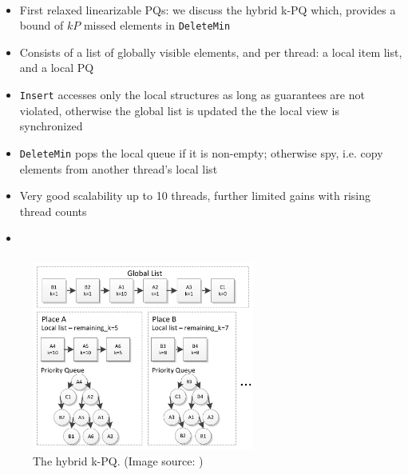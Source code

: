 \documentclass[usenames,dvipsnames]{beamer}
\begin{document}
\begin{frame}{}
\framesubtitle{\citeauthor{wimmer2013data}}
\begin{itemize}
\item First relaxed linearizable \acp{PQ}: we discuss the hybrid k-\ac{PQ} which, provides a bound of
      $kP$ missed elements in \lstinline|DeleteMin|
\item Consists of a list of globally visible elements, and per thread: a local item list, and a local
      \ac{PQ}
\item \lstinline|Insert| accesses only the local structures as long as guarantees are not violated,
      otherwise the global list is updated the the local view is synchronized
\item \lstinline|DeleteMin| pops the local queue if it is non-empty; otherwise spy, i.e. copy
      elements from another thread's local list
\item Very good scalability up to 10 threads, further limited gains with rising thread counts
\item {}
\end{itemize}
\end{frame}

\begin{frame}{}
\framesubtitle{\citeauthor{wimmer2013data}}

\begin{figure}
\includegraphics[width = 0.65\textwidth]{wimmer}
\caption{The \citeauthor{wimmer2013data} hybrid k-\ac{PQ}. (Image source: \cite{wimmer2013data})}
\end{figure}
\end{frame}

\end{document}
